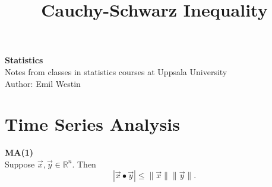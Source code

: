 \documentclass[11pt]{article}
\begin{document}
\title{Cauchy-Schwarz Inequality}

\thispagestyle{empty}

\begin{center}
{\LARGE \bf Statistics}\\
Notes from classes in statistics courses at Uppsala University \\
Author: Emil Westin
\end{center}

\section{Time Series Analysis}

\textbf{MA(1)}\\
Suppose $\vec{x},\vec{y} \in \mathbb{R}^n$. Then 
\begin{equation}
|\vec{x} \bullet \vec{y}| \le \|\vec{x}\| \|\vec{y}\| \label{cs-ineq}.
\end{equation}
\end{document}
